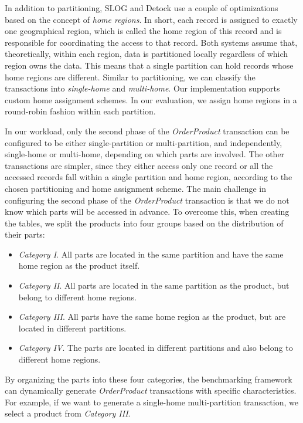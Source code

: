 In addition to partitioning, SLOG and Detock use a couple of optimizations based on the concept of \textit{home regions}. In short, each record is assigned to exactly one geographical region, which is called the home region of this record and is responsible for coordinating the access to that record. Both systems assume that, theoretically, within each region, data is partitioned locally regardless of which region owns the data. This means that a single partition can hold records whose home regions are different. Similar to partitioning, we can classify the transactions into \textit{single-home} and \textit{multi-home}. Our implementation supports custom home assignment schemes. In our evaluation, we assign home regions in a round-robin fashion within each partition.

In our workload, only the second phase of the \textit{OrderProduct} transaction can be configured to be either single-partition or multi-partition, and independently, single-home or multi-home, depending on which parts are involved. The other transactions are simpler, since they either access only one record or all the accessed records fall within a single partition and home region, according to the chosen partitioning and home assignment scheme. The main challenge in configuring the second phase of the \textit{OrderProduct} transaction is that we do not know which parts will be accessed in advance. To overcome this, when creating the tables, we split the products into four groups based on the distribution of their parts:
\begin{itemize}
    \item \textit{Category I}. All parts are located in the same partition and have the same home region as the product itself.
    \item \textit{Category II}. All parts are located in the same partition as the product, but belong to different home regions.
    \item \textit{Category III}. All parts have the same home region as the product, but are located in different partitions.
    \item \textit{Category IV}. The parts are located in different partitions and also belong to different home regions.
\end{itemize}

By organizing the parts into these four categories, the benchmarking framework can dynamically generate \textit{OrderProduct} transactions with specific characteristics. For example, if we want to generate a single-home multi-partition transaction, we select a product from \textit{Category III}.

